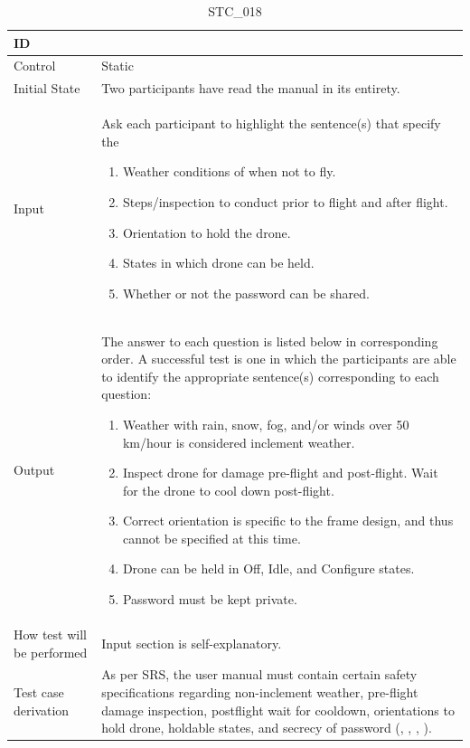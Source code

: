 \documentclass[12pt, titlepage]{article}
\begin{document}
\begin{table}[!h]
\begin{center}
\caption {STC\_018}
\label{tab:STC_018}
\begin{tabular}{ | m{3.2cm} | m{12.2cm} | } 
\hline
ID & \nameref{tab:STC_018} \\ 
\hline
Control & Static \\ 
\hline
Initial State & Two participants have read the manual in its entirety. \\ 
\hline
Input & Ask each participant to highlight the sentence(s) that specify the
\begin{enumerate}[topsep=0pt,itemsep=-1ex,partopsep=1ex,parsep=1ex]
        \item Weather conditions of when not to fly.
	\item Steps/inspection to conduct prior to flight and after flight.
	\item Orientation to hold the drone.
	\item States in which drone can be held.
        \item Whether or not the password can be shared.
\end{enumerate}
\\ 
\hline
Output & The answer to each question is listed below in corresponding order. A successful test is one in which the participants are able to identify the appropriate sentence(s) corresponding to each question: 
\begin{enumerate}[topsep=0pt,itemsep=-1ex,partopsep=1ex,parsep=1ex]
	\item Weather with rain, snow, fog, and/or winds over 50 km/hour is considered inclement weather.
	\item Inspect drone for damage pre-flight and post-flight. Wait for the drone to cool down post-flight.
	\item Correct orientation is specific to the frame design, and thus cannot be specified at this time.
	\item Drone can be held in Off, Idle, and Configure states.
    \item Password must be kept private.
\end{enumerate}\\ 
\hline
How test will be performed & Input section is self-explanatory. \\ 
\hline
Test case derivation & As per SRS, the user manual must contain certain safety specifications regarding non-inclement weather, pre-flight damage inspection, postflight wait for cooldown, orientations to hold drone, holdable states, and secrecy of password (\nameref{SR_002}, \nameref{SR_006}, \nameref{SR_010}, \nameref{SAFE_003}). 
 \\ 
\hline
\end{tabular}
\end{center}
\end{table}
\end{document}
